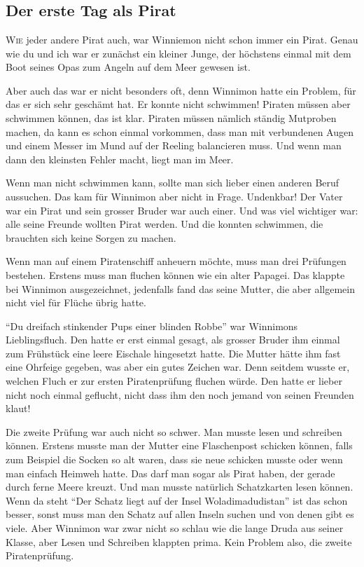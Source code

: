 \chapter*{}
\section*{\center \skull Der erste Tag als Pirat \skull}
\lettrine[lines=3]{\color{red}W}{ie} jeder andere Pirat auch, war Winniemon nicht schon immer ein Pirat. Genau wie du und ich war er zunächst ein kleiner Junge, der höchstens einmal mit dem Boot seines Opas zum Angeln auf dem Meer gewesen ist. 

Aber auch das war er nicht besonders oft, denn Winnimon hatte ein Problem, für das er sich sehr geschämt hat. Er konnte nicht schwimmen! Piraten müssen aber schwimmen können, das ist klar. Piraten müssen nämlich ständig Mutproben machen, da kann es schon einmal vorkommen, dass man mit verbundenen Augen und einem Messer im Mund auf der Reeling balancieren muss. Und wenn man dann den kleinsten Fehler macht, liegt man im Meer.

Wenn man nicht schwimmen kann, sollte man sich lieber einen anderen Beruf aussuchen. Das kam für Winnimon aber nicht in Frage. Undenkbar! Der Vater war ein Pirat und sein grosser Bruder war auch einer. Und was viel wichtiger war: alle seine Freunde wollten Pirat werden. Und die konnten schwimmen, die brauchten sich keine Sorgen zu machen.

Wenn man auf einem Piratenschiff anheuern möchte, muss man drei Prüfungen bestehen. Erstens muss man fluchen können wie ein alter Papagei. Das klappte bei Winnimon ausgezeichnet, jedenfalls fand das seine Mutter, die aber allgemein nicht viel für Flüche übrig hatte. 

\enquote{Du dreifach stinkender Pups einer blinden Robbe} war Winnimons Lieblingsfluch. Den hatte er erst einmal gesagt, als grosser Bruder ihm einmal zum Frühstück eine leere Eischale hingesetzt hatte. Die Mutter hätte ihm fast eine Ohrfeige gegeben, was aber ein gutes Zeichen war. Denn seitdem wusste er, welchen Fluch er zur ersten Piratenprüfung fluchen würde. Den hatte er lieber nicht noch einmal geflucht, nicht dass ihm den noch jemand von seinen Freunden klaut!

Die zweite Prüfung war auch nicht so schwer. Man musste lesen und schreiben können. Erstens musste man der Mutter eine Flaschenpost schicken können, falls zum Beispiel die Socken so alt waren, dass sie neue schicken musste oder wenn man einfach Heimweh hatte. Das darf man sogar als Pirat haben, der gerade durch ferne Meere kreuzt. Und man musste natürlich Schatzkarten lesen können. Wenn da steht \enquote{Der Schatz liegt auf der Insel Woladimadudistan} ist das schon besser, sonst muss man den Schatz auf allen Inseln suchen und von denen gibt es viele. Aber Winnimon war zwar nicht so schlau wie die lange Druda aus seiner Klasse, aber Lesen und Schreiben klappten prima. Kein Problem also, die zweite Piratenprüfung.

